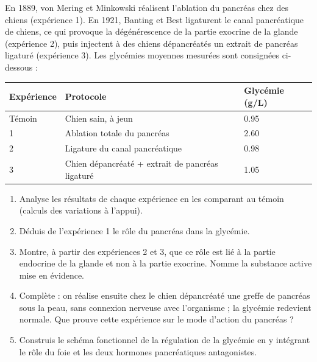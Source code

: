 \documentclass[11pt]{article}
\begin{document}
\begin{exercice}
En 1889, von Mering et Minkowski réalisent l'ablation du pancréas chez des chiens (expérience 1). En 1921, Banting et Best ligaturent le canal pancréatique de chiens, ce qui provoque la dégénérescence de la partie exocrine de la glande (expérience 2), puis injectent à des chiens dépancréatés un extrait de pancréas ligaturé (expérience 3). Les glycémies moyennes mesurées sont consignées ci-dessous :
\begin{center}
\begin{tabularx}{\linewidth}{|l|X|X|}\hline
\rowcolor{popblueL} Expérience & Protocole & Glycémie (g/L) \\ \hline
Témoin & Chien sain, à jeun & \num{0,95} \\ \hline
1 & Ablation totale du pancréas & \num{2,60} \\ \hline
2 & Ligature du canal pancréatique & \num{0,98} \\ \hline
3 & Chien dépancréaté + extrait de pancréas ligaturé & \num{1,05} \\ \hline
\end{tabularx}
\end{center}
\begin{enumerate}
\item Analyse les résultats de chaque expérience en les comparant au témoin (calculs des variations à l'appui).
\item Déduis de l'expérience 1 le rôle du pancréas dans la glycémie.
\item Montre, à partir des expériences 2 et 3, que ce rôle est lié à la partie endocrine de la glande et non à la partie exocrine. Nomme la substance active mise en évidence.
\item Complète : on réalise ensuite chez le chien dépancréaté une greffe de pancréas sous la peau, sans connexion nerveuse avec l'organisme ; la glycémie redevient normale. Que prouve cette expérience sur le mode d'action du pancréas ?
\item Construis le schéma fonctionnel de la régulation de la glycémie en y intégrant le rôle du foie et les deux hormones pancréatiques antagonistes.
\end{enumerate}
\end{exercice}
\end{document}
